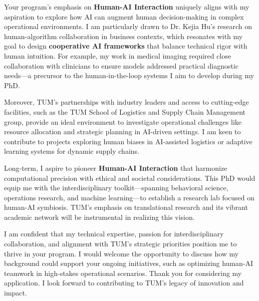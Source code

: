 \documentclass[11pt,a4paper, final]{moderncv}
\begin{document}
Your program's emphasis on \textbf{Human-AI Interaction} 
uniquely aligns with my aspiration to explore how AI can augment human decision-making in complex operational environments.  
I am particularly drawn to Dr. Kejia Hu's research on human-algorithm collaboration in business contexts, 
which resonates with my goal to design \textbf{cooperative AI frameworks} that balance technical rigor with human intuition. 
For example, my work in medical imaging required close collaboration with clinicians to 
ensure models addressed practical diagnostic needs—a precursor to 
the human-in-the-loop systems I aim to develop during my PhD.

Moreover, TUM's partnerships with industry leaders and access to cutting-edge facilities, 
such as the TUM School of Logistics and Supply Chain Management group, 
provide an ideal environment to investigate operational challenges like 
resource allocation and strategic planning in AI-driven settings. 
I am keen to contribute to projects exploring human biases in 
AI-assisted logistics or adaptive learning systems for dynamic supply chains.

Long-term, I aspire to pioneer \textbf{Human-AI Interaction} that 
harmonize computational precision with ethical and societal considerations. 
This PhD would equip me with the interdisciplinary toolkit—spanning behavioral science, operations research, 
and machine learning—to establish a research lab focused on human-AI symbiosis. 
TUM's emphasis on translational research and its vibrant academic network will be instrumental in realizing this vision.

I am confident that my technical expertise, passion for interdisciplinary collaboration, 
and alignment with TUM's strategic priorities position me to thrive in your program. 
I would welcome the opportunity to discuss how my background could support your ongoing initiatives, 
such as optimizing human-AI teamwork in high-stakes operational scenarios. 
Thank you for considering my application. 
I look forward to contributing to TUM's legacy of innovation and impact.

\makeletterclosing
\end{document}
